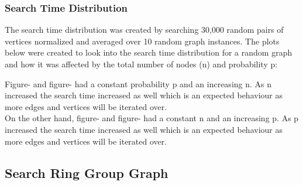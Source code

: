 \documentclass[11pt,a4paper,notitlepage]{article}
\begin{document}
\subsubsection*{Search Time Distribution}
The search time distribution was created by searching 30,000 random pairs of vertices normalized and averaged over 10 random graph instances. The plots below were created to look into the search time distribution for a random graph and how it was affected by the total number of nodes (n) and probability p:

\noindent
Figure- and figure- had a constant probability p and an increasing n. As n increased the search time increased as well which is an expected behaviour as more edges and vertices will be iterated over. \\

\noindent
On the other hand, figure- and figure- had a constant n and an increasing p. As p increased the search time increased as well which is an expected behaviour as more edges and vertices will be iterated over. 

\subsection*{Search Ring Group Graph}
\end{document}
